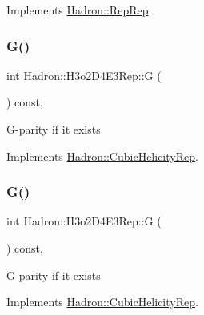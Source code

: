 Implements \mbox{\hyperlink{structHadron_1_1RepRep_a92c8802e5ed7afd7da43ccfd5b7cd92b}{Hadron\+::\+Rep\+Rep}}.

\mbox{\label{structHadron_1_1H3o2D4E3Rep_a02908f3ed8b795cdacd78ceea2b11ad1}} 
\subsubsection{\texorpdfstring{G()}{G()}\hspace{0.1cm}{\footnotesize\ttfamily [1/3]}}
{\footnotesize\ttfamily int Hadron\+::\+H3o2\+D4\+E3\+Rep\+::G (\begin{DoxyParamCaption}{ }\end{DoxyParamCaption}) const\hspace{0.3cm}{\ttfamily [inline]}, {\ttfamily [virtual]}}

G-\/parity if it exists 

Implements \mbox{\hyperlink{structHadron_1_1CubicHelicityRep_a50689f42be1e6170aa8cf6ad0597018b}{Hadron\+::\+Cubic\+Helicity\+Rep}}.

\mbox{\label{structHadron_1_1H3o2D4E3Rep_a02908f3ed8b795cdacd78ceea2b11ad1}} 
\subsubsection{\texorpdfstring{G()}{G()}\hspace{0.1cm}{\footnotesize\ttfamily [2/3]}}
{\footnotesize\ttfamily int Hadron\+::\+H3o2\+D4\+E3\+Rep\+::G (\begin{DoxyParamCaption}{ }\end{DoxyParamCaption}) const\hspace{0.3cm}{\ttfamily [inline]}, {\ttfamily [virtual]}}

G-\/parity if it exists 

Implements \mbox{\hyperlink{structHadron_1_1CubicHelicityRep_a50689f42be1e6170aa8cf6ad0597018b}{Hadron\+::\+Cubic\+Helicity\+Rep}}.

\mbox{\label{structHadron_1_1H3o2D4E3Rep_a02908f3ed8b795cdacd78ceea2b11ad1}} 
